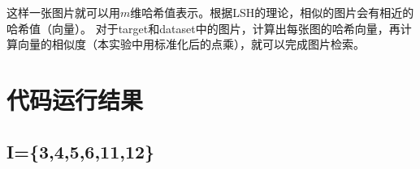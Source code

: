 \documentclass[12pt,a4paper]{article}
\begin{document}
这样一张图片就可以用$m$维哈希值表示。根据LSH的理论，相似的图片会有相近的哈希值（向量）。
对于target和dataset中的图片，计算出每张图的哈希向量，再计算向量的相似度（本实验中用标准化后的点乘），就可以完成图片检索。

\section{代码运行结果}
\subsection{I=\{3,4,5,6,11,12\}}
\begin{figure}[H]
\end{figure}
\end{document}
